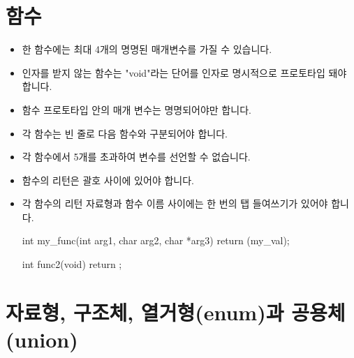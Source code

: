 \documentclass{42-ko}
\begin{document}
    \section{함수}

        \begin{itemize}

            \item 한 함수에는 최대 4개의 명명된 매개변수를 가질 수 있습니다.

            \item 인자를 받지 않는 함수는 "void"라는 단어를 인자로
                명시적으로 프로토타입 돼야 합니다.

            \item 함수 프로토타입 안의 매개 변수는 명명되어야만 합니다.

            \item 각 함수는 빈 줄로 다음 함수와 구분되어야 합니다.

            \item 각 함수에서 5개를 초과하여 변수를 선언할 수 없습니다.

            \item 함수의 리턴은 괄호 사이에 있어야 합니다.

            \item 각 함수의 리턴 자료형과 함수 이름 사이에는
                한 번의 탭 들여쓰기가 있어야 합니다.

            \begin{42ccode}
int my_func(int arg1, char arg2, char *arg3)
{
    return (my_val);
}

int func2(void)
{
    return ;
}
            \end{42ccode}

        \end{itemize}
        \newpage


    \section{자료형, 구조체, 열거형(enum)과 공용체(union)}
\end{document}
